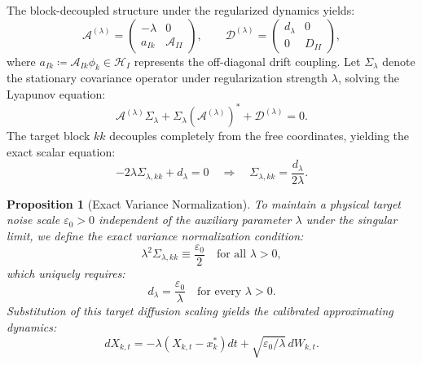 \documentclass[11pt]{amsart}
\theoremstyle{plain}
\newtheorem{proposition}[theorem]{Proposition}
\theoremstyle{definition}
\theoremstyle{remark}
\begin{document}
The block-decoupled structure under the regularized dynamics yields:
\begin{equation}
  \mathcal{A}^{(\lambda)}=
  \begin{pmatrix}-\lambda&0\\a_{Ik}&\mathcal{A}_{II}\end{pmatrix},\qquad
  \mathcal{D}^{(\lambda)}=
  \begin{pmatrix}d_\lambda&0\\0&D_{II}\end{pmatrix},
\end{equation}
where $a_{Ik} \coloneqq \mathcal{A}_{Ik} \phi_k \in \mathcal{H}_I$ represents the off-diagonal drift coupling.
Let $\Sigma_\lambda$ denote the stationary covariance operator under regularization strength $\lambda$, solving the Lyapunov equation:
\begin{equation}
  \mathcal{A}^{(\lambda)}\Sigma_\lambda + \Sigma_\lambda(\mathcal{A}^{(\lambda)})^* + \mathcal{D}^{(\lambda)} = 0.
\end{equation}
The target block $kk$ decouples completely from the free coordinates, yielding the exact scalar equation:
\begin{equation}
  -2\lambda\Sigma_{\lambda,kk} + d_\lambda = 0 \quad \Longrightarrow \quad \Sigma_{\lambda,kk} = \frac{d_\lambda}{2\lambda}.
\end{equation}

\begin{proposition}[Exact Variance Normalization]
  \label{prop:exact_calibration}
  To maintain a physical target noise scale $\varepsilon_0 > 0$ independent of the auxiliary parameter $\lambda$ under the singular limit, we define the exact variance normalization condition:
  \begin{equation}
    \lambda^2 \Sigma_{\lambda,kk} \equiv \frac{\varepsilon_0}{2} \quad \text{for all } \lambda > 0,
  \end{equation}
  which uniquely requires:
  \begin{equation}
    d_\lambda = \frac{\varepsilon_0}{\lambda} \quad \text{for every } \lambda > 0.
  \end{equation}
  Substitution of this target diffusion scaling yields the calibrated approximating dynamics:
  \begin{equation}
    dX_{k,t} = -\lambda (X_{k,t} - x_k^*) dt + \sqrt{\varepsilon_0 / \lambda}\, dW_{k,t}.
  \end{equation}
\end{proposition}
\end{document}
